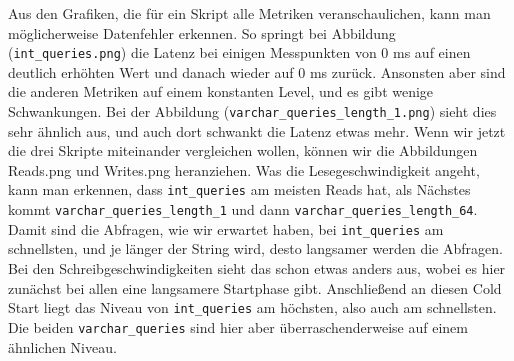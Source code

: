 Aus den Grafiken, die für ein Skript alle Metriken veranschaulichen, kann man möglicherweise Datenfehler erkennen.
So springt bei Abbildung (\texttt{int\_queries.png}) die Latenz bei einigen Messpunkten von 0 ms auf einen deutlich erhöhten Wert und danach wieder auf 0 ms zurück.
Ansonsten aber sind die anderen Metriken auf einem konstanten Level, und es gibt wenige Schwankungen.
Bei der Abbildung (\texttt{varchar\_queries\_length\_1.png}) sieht dies sehr ähnlich aus, und auch dort schwankt die Latenz etwas mehr.
Wenn wir jetzt die drei Skripte miteinander vergleichen wollen, können wir die Abbildungen Reads.png und Writes.png heranziehen.
Was die Lesegeschwindigkeit angeht, kann man erkennen, dass \texttt{int\_queries} am meisten Reads hat, als Nächstes kommt \texttt{varchar\_queries\_length\_1} und dann \texttt{varchar\_queries\_length\_64}.
Damit sind die Abfragen, wie wir erwartet haben, bei \texttt{int\_queries} am schnellsten, und je länger der String wird, desto langsamer werden die Abfragen.
Bei den Schreibgeschwindigkeiten sieht das schon etwas anders aus, wobei es hier zunächst bei allen eine langsamere Startphase gibt.
Anschließend an diesen Cold Start liegt das Niveau von \texttt{int\_queries} am höchsten, also auch am schnellsten.
Die beiden \texttt{varchar\_queries} sind hier aber überraschenderweise auf einem ähnlichen Niveau.

